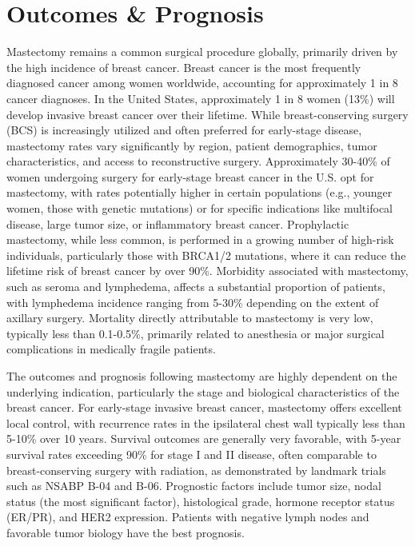 \section*{Outcomes \& Prognosis}
Mastectomy remains a common surgical procedure globally, primarily driven by the high incidence of breast cancer. Breast cancer is the most frequently diagnosed cancer among women worldwide, accounting for approximately 1 in 8 cancer diagnoses. In the United States, approximately 1 in 8 women (13\%) will develop invasive breast cancer over their lifetime. While breast-conserving surgery (BCS) is increasingly utilized and often preferred for early-stage disease, mastectomy rates vary significantly by region, patient demographics, tumor characteristics, and access to reconstructive surgery. Approximately 30-40\% of women undergoing surgery for early-stage breast cancer in the U.S. opt for mastectomy, with rates potentially higher in certain populations (e.g., younger women, those with genetic mutations) or for specific indications like multifocal disease, large tumor size, or inflammatory breast cancer. Prophylactic mastectomy, while less common, is performed in a growing number of high-risk individuals, particularly those with BRCA1/2 mutations, where it can reduce the lifetime risk of breast cancer by over 90\%. Morbidity associated with mastectomy, such as seroma and lymphedema, affects a substantial proportion of patients, with lymphedema incidence ranging from 5-30\% depending on the extent of axillary surgery. Mortality directly attributable to mastectomy is very low, typically less than 0.1-0.5\%, primarily related to anesthesia or major surgical complications in medically fragile patients.

The outcomes and prognosis following mastectomy are highly dependent on the underlying indication, particularly the stage and biological characteristics of the breast cancer. For early-stage invasive breast cancer, mastectomy offers excellent local control, with recurrence rates in the ipsilateral chest wall typically less than 5-10\% over 10 years. Survival outcomes are generally very favorable, with 5-year survival rates exceeding 90\% for stage I and II disease, often comparable to breast-conserving surgery with radiation, as demonstrated by landmark trials such as NSABP B-04 and B-06. Prognostic factors include tumor size, nodal status (the most significant factor), histological grade, hormone receptor status (ER/PR), and HER2 expression. Patients with negative lymph nodes and favorable tumor biology have the best prognosis.

